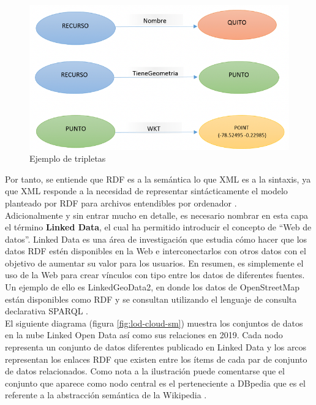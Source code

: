 \begin{figure}[H]
	\centering
	\includegraphics[width=0.73\linewidth]{imagenes/capitulo3/Imagen1}
	\caption{Ejemplo de tripletas \cite{coursera}}
	\label{fig:imagen1}
\end{figure}



Por tanto, se entiende que RDF es a la semántica lo que XML es a la sintaxis, ya que XML responde a la necesidad de representar sintácticamente el modelo planteado por RDF para archivos entendibles por ordenador \cite{web-semantica-w3c}.\\

Adicionalmente y sin entrar mucho en detalle, es necesario nombrar en esta capa el término \textbf{Linked Data}, el cual ha permitido introducir el concepto de ``Web de datos''. Linked Data es una área de investigación que estudia cómo hacer que los datos RDF estén disponibles en la Web e interconectarlos con otros datos con el objetivo de aumentar su valor para los usuarios. En resumen, es simplemente el uso de la Web para crear vínculos con tipo entre los datos de diferentes fuentes. Un ejemplo de ello es LinkedGeoData2, en donde los datos de OpenStreetMap están disponibles como RDF y se consultan utilizando el lenguaje de consulta declarativa SPARQL \cite{wkt-database, aplicacion}.\\

El siguiente diagrama (figura \ref{fig:lod-cloud-sm}) muestra los conjuntos de datos en la nube Linked Open Data así como sus relaciones en 2019. Cada nodo representa un conjunto de datos diferentes publicado en Linked Data y los arcos representan los enlaces RDF que existen entre los ítems de cada par de conjunto de datos relacionados. Como nota a la ilustración puede comentarse que el conjunto que aparece como nodo central es el perteneciente a DBpedia que es el referente a la abstracción semántica de la Wikipedia \cite{aplicacion}.

